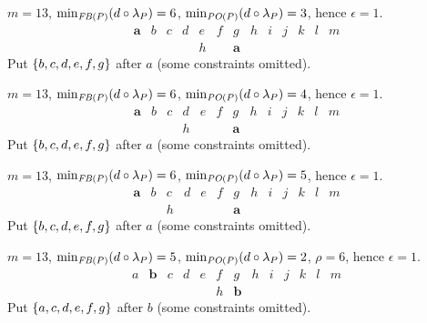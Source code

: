 \documentclass[pagesize, twoside=off, bibliography=totoc, DIV=calc, fontsize=12pt, a4paper]{scrartcl}
\begin{document}
\begin{example}
	$m = 13$, $\minineq[\FBP] = 6$, $\minineq[\POP] = 3$, hence $\epsilon = 1$.
	\begin{equation}
		\begin{array}{lllllllllllll}
			\bm{a}	& b	& c	& d	& e	& f	& g	& h	& i & j & k & l & m\\
			& & & & h & & \bm{a}
		\end{array}
	\end{equation}
	Put $\{b, c, d, e, f, g\}$ after $a$ (some constraints omitted).
\end{example}

\begin{example}
	$m = 13$, $\minineq[\FBP] = 6$, $\minineq[\POP] = 4$, hence $\epsilon = 1$.
	\begin{equation}
		\begin{array}{lllllllllllll}
			\bm{a}	& b	& c	& d	& e	& f	& g	& h	& i & j & k & l & m\\
			& & & h & & & \bm{a}
		\end{array}
	\end{equation}
	Put $\{b, c, d, e, f, g\}$ after $a$ (some constraints omitted).
\end{example}

\begin{example}
	$m = 13$, $\minineq[\FBP] = 6$, $\minineq[\POP] = 5$, hence $\epsilon = 1$.
	\begin{equation}
		\begin{array}{lllllllllllll}
			\bm{a}	& b	& c	& d	& e	& f	& g	& h	& i & j & k & l & m\\
			& & h & & & & \bm{a}
		\end{array}
	\end{equation}
	Put $\{b, c, d, e, f, g\}$ after $a$ (some constraints omitted).
\end{example}

\begin{example}
	$m = 13$, $\minineq[\FBP] = 5$, $\minineq[\POP] = 2$, $\rho = 6$, hence $\epsilon = 1$.
	\begin{equation}
		\begin{array}{lllllllllllll}
			a	& \bm{b}	& c	& d	& e	& f	& g	& h	& i & j & k & l & m\\
			& & & & & h & \bm{b}
		\end{array}
	\end{equation}
	Put $\{a, c, d, e, f, g\}$ after $b$ (some constraints omitted).
\end{example}
\end{document}
